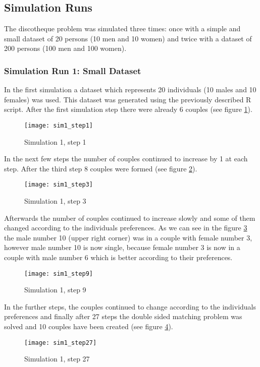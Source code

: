 \clearpage
\subsection{Simulation Runs}
The discotheque problem was simulated three times: once with a simple and small dataset of 20 persons (10 men and 10 women) and twice with a dataset of 200 persons (100 men and 100 women).

\subsubsection{Simulation Run 1: Small Dataset}
In the first simulation a dataset which represents 20 individuals (10 males and 10 females) was used. 
This dataset was generated using the previously described R script.
After the first simulation step there were already 6 couples (see figure \ref{fig:sim1_step1}).
\begin{figure}[H]
  \centering
  \texttt{[image: sim1\_step1]}
	\caption{Simulation 1, step 1}
	\label{fig:sim1_step1}
\end{figure}

In the next few steps the number of couples continued to increase by 1 at each step. 
After the third step 8 couples were formed (see figure \ref{fig:sim1_step3}).
\begin{figure}[H]
  \centering
  \texttt{[image: sim1\_step3]}
	\caption{Simulation 1, step 3}
	\label{fig:sim1_step3}
\end{figure}

Afterwards the number of couples continued to increase slowly and some of them changed according to the individuals preferences. 
As we can see in the figure \ref{fig:sim1_step9} the male number 10 (upper right corner) was in a couple with female number 3, however male number 10 is now single, because female number 3 is now in a couple with male number 6 which is better according to their preferences.
\begin{figure}[H]
  \centering
  \texttt{[image: sim1\_step9]}
	\caption{Simulation 1, step 9}
	\label{fig:sim1_step9}
\end{figure}

In the further steps, the couples continued to change according to the individuals preferences and finally after 27 steps the double sided matching problem was solved and 10 couples have been created (see figure \ref{fig:sim1_step27}).
\begin{figure}[H]
  \centering
  \texttt{[image: sim1\_step27]}
	\caption{Simulation 1, step 27}
	\label{fig:sim1_step27}
\end{figure}

